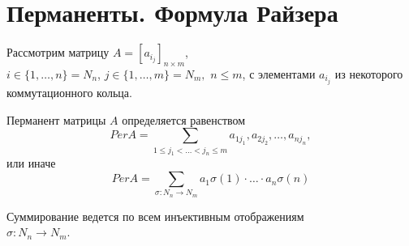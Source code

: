 \section{Перманенты. Формула Райзера}

Рассмотрим матрицу $A=[a_{i_j}]_{n \times m}$, \\ $i\in\{1,\ldots,n\}=N_n$,
 $j \in \{1,\ldots,m\}=N_m,$ $n \leq m$, с элементами $a_{i_j}$ из некоторого коммутационного кольца.

\opr Перманент матрицы $A$ определяется равенством
$$
Per A = \sum_{1\leq j_1<\ldots<j_n\leq m} a_{1j_1}, a_{2j_2}, \ldots, a_{nj_n},
$$
или иначе 
$$
Per A = \sum_{\sigma:N_n \rightarrow N_m} a_1 \sigma(1) \cdot \ldots \cdot a_n \sigma(n)
$$

Суммирование ведется по всем инъективным отображениям \\ $\sigma:N_n \rightarrow N_m$.
\\
\prop
